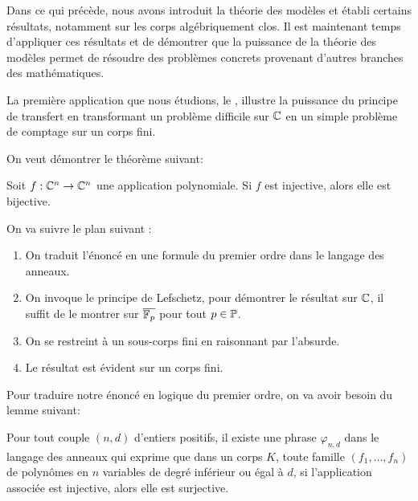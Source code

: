Dans ce qui précède, nous avons introduit la théorie des modèles et établi
certains résultats, notamment sur les corps algébriquement clos. Il est
maintenant temps d'appliquer ces résultats et de démontrer que la puissance de
la théorie des modèles permet de résoudre des problèmes concrets provenant
d'autres branches des mathématiques.

La première application que nous étudions, le , illustre la puissance du principe de transfert en
transformant un problème difficile sur $\mathbb{C}$ en un simple problème de comptage
sur un corps fini. 

On veut démontrer le théorème suivant: 

\begin{theo}[Ax-Grothendieck]\label{theo-Ax-Grothendieck}
Soit $f : \mathbb{C}^n \rightarrow \mathbb{C}^n$ une application polynomiale. Si $f$ est
injective, alors elle est bijective. 
\end{theo}

On va suivre le plan suivant :

\begin{enumerate}[label= (\roman*)]
\item On traduit l'énoncé en une formule du premier ordre dans le langage des anneaux.
\item On invoque le principe de Lefschetz, pour démontrer le résultat sur $\mathbb{C}$,
il suffit de le montrer sur $\overline{\mathbb{F}_p}$ pour tout $p \in \mathbb{P}$.
\item On se restreint à un sous-corps fini en raisonnant par l'absurde.
\item Le résultat est évident sur un corps fini.

\end{enumerate}






Pour traduire notre énoncé en logique du premier ordre, on va avoir besoin du lemme suivant: 

\begin{lemm} \label{lemm-phrase-corps}
Pour tout couple $(n,d)$ d'entiers positifs, il existe une phrase
$\varphi_{n,d}$ dans le langage des anneaux qui exprime que dans un corps $K$,
toute famille $(f_1, \ldots, f_n)$ de polynômes en $n$ variables de degré
inférieur ou égal à $d$, si l'application associée est injective, alors elle est surjective.
\end{lemm}

